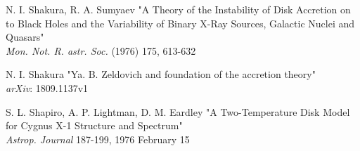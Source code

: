 \documentclass[a4paperbi]{article}
\begin{document}
\begin{thebibliography}{9}
	N. I. Shakura, R. A. Sumyaev 
	"A Theory of the Instability of Disk Accretion on to Black Holes and the Variability of Binary X-Ray Sources, Galactic Nuclei and Quasars"\\
	\textit{Mon. Not. R. astr. Soc.} (1976) 175, 613-632
	
	N. I. Shakura
	"Ya. B. Zeldovich and foundation of the accretion theory"\\
	\textit{arXiv}: 1809.1137v1
	
	S. L. Shapiro, A. P. Lightman, D. M. Eardley 
	"A Two-Temperature Disk Model for Cygnus X-1 Structure and Spectrum"\\
	\textit{Astrop. Journal} 187-199, 1976 February 15
\end{thebibliography}
\end{document}
